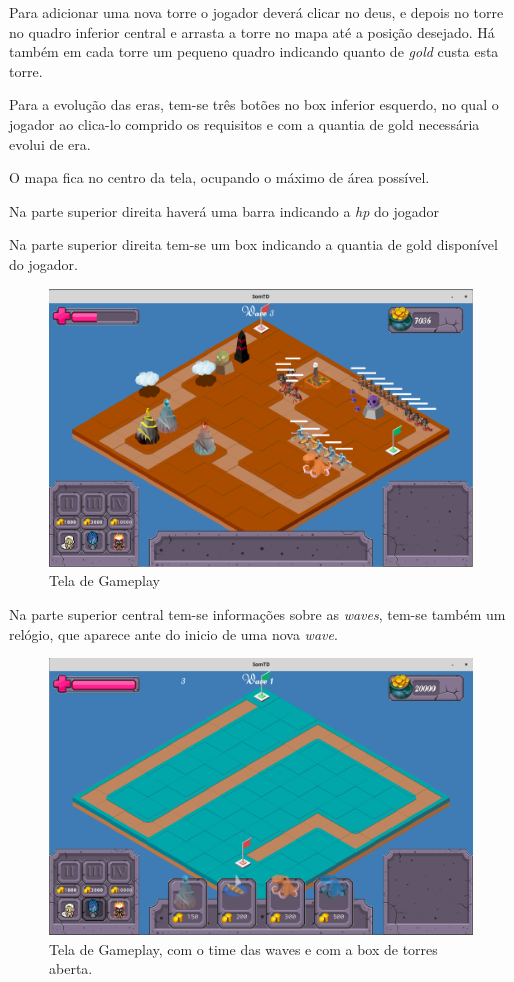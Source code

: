 \documentclass[11pt]{article} %
\begin{document}
Para adicionar uma nova torre o jogador deverá clicar no deus, e depois no torre no quadro inferior central e arrasta a torre no mapa até a posição desejado. Há também em cada torre um pequeno quadro indicando quanto de \textit{gold} custa esta torre.

Para a evolução das eras, tem-se três botões no box inferior esquerdo, no qual o jogador ao clica-lo comprido os requisitos e com a quantia de gold necessária evolui de era.

O mapa fica no centro da tela, ocupando o máximo de área possível.

Na parte superior direita haverá uma barra indicando a \textit{hp} do jogador

Na parte superior direita tem-se um box indicando a quantia de gold disponível do jogador.

\begin{figure}[!htp]
\centering
\includegraphics[scale=0.3]{res/gameplay_display.png}
\caption{Tela de Gameplay}
\end{figure}

Na parte superior central tem-se informações sobre as \textit{waves}, tem-se também um relógio, que aparece ante do inicio de uma nova \textit{wave}.

\begin{figure}[!htp]
\centering
\includegraphics[scale=0.3]{res/gameplay2.png}
\caption{Tela de Gameplay, com o time das waves e com a box de torres aberta.}
\end{figure}
\end{document}
